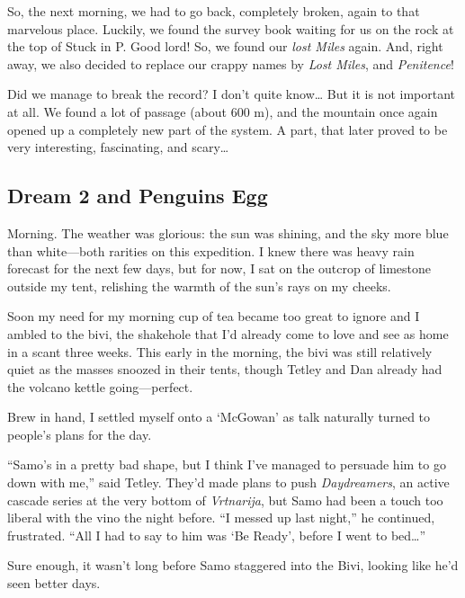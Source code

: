 So, the next morning, we had to go back, completely broken, again to
that marvelous place. Luckily, we found the survey book waiting for us
on the rock at the top of Stuck in P. Good lord! So, we found our
\emph{lost Miles} again. And, right away, we also decided to replace our
crappy names by \emph{Lost Miles}, and \emph{Penitence}!

Did we manage to break the record? I don't quite know\ldots{} But it is
not important at all. We found a lot of passage (about 600 m), and the
mountain once again opened up a completely new part of the system. A
part, that later proved to be very interesting, fascinating, and
scary\ldots{}


\hypertarget{dream-2-and-penguins-egg}{%
\subsection{Dream 2 and Penguins Egg}\label{dream-2-and-penguins-egg}}

Morning. The weather was glorious: the sun was shining, and the sky more
blue than white---both rarities on this expedition. I knew there was
heavy rain forecast for the next few days, but for now, I sat on the
outcrop of limestone outside my tent, relishing the warmth of the sun's
rays on my cheeks.

Soon my need for my morning cup of tea became too great to ignore and I
ambled to the bivi, the shakehole that I'd already come to love and see
as home in a scant three weeks. This early in the morning, the bivi was
still relatively quiet as the masses snoozed in their tents, though
Tetley and Dan already had the volcano kettle going---perfect.

Brew in hand, I settled myself onto a `McGowan'
 as
talk naturally turned to people's plans for the day.

``Samo's in a pretty bad shape, but I think I've managed to persuade him
to go down with me,'' said Tetley. They'd made plans to push
\emph{Daydreamers}, an active cascade series at the very bottom of
\emph{Vrtnarija}, but Samo had been a touch too liberal with the vino
the night before. ``I messed up last night,'' he continued, frustrated.
``All I had to say to him was `Be Ready', before I went to bed\ldots{}''

Sure enough, it wasn't long before Samo staggered into the Bivi, looking
like he'd seen better days.

